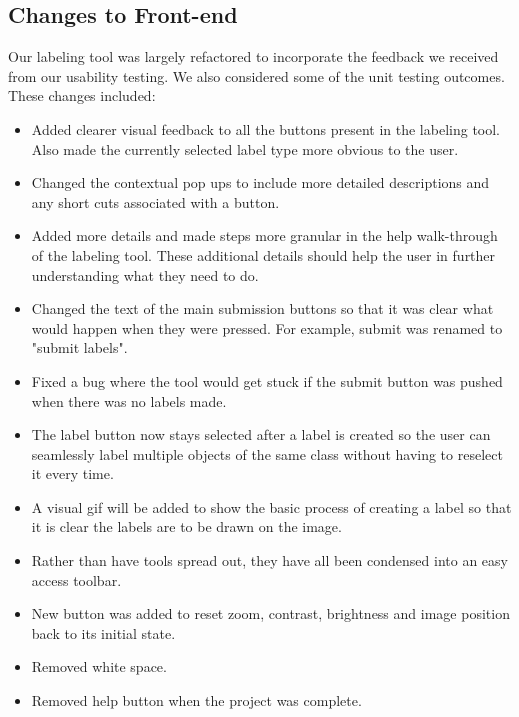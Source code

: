 \documentclass[12pt, titlepage]{article}
\begin{document}
\subsection{Changes to Front-end}
Our labeling tool was largely refactored to incorporate the feedback we received from our usability testing. We also considered some of the unit testing outcomes. These changes included:
\begin{itemize}
    \item Added clearer visual feedback to all the buttons present in the labeling tool. Also made the currently selected label type more obvious to the user.
    \item Changed the contextual pop ups to include more detailed descriptions and any short cuts associated with a button.
    \item Added more details and made steps more granular in the help walk-through of the labeling tool. These additional details should help the user in further understanding what they need to do.
    \item Changed the text of the main submission buttons so that it was clear what would happen when they were pressed. For example, submit was renamed to "submit labels".
    \item Fixed a bug where the tool would get stuck if the submit button was pushed when there was no labels made.
    \item The label button now stays selected after a label is created so the user can seamlessly label multiple objects of the same class without having to reselect it every time.
    \item A visual gif will be added to show the basic process of creating a label so that it is clear the labels are to be drawn on the image.
    \item Rather than have tools spread out, they have all been condensed into an easy access toolbar.
    \item New button was added to reset zoom, contrast, brightness and image position back to its initial state.
    \item Removed white space.
    \item Removed help button when the project was complete.
\end{itemize}
\end{document}

